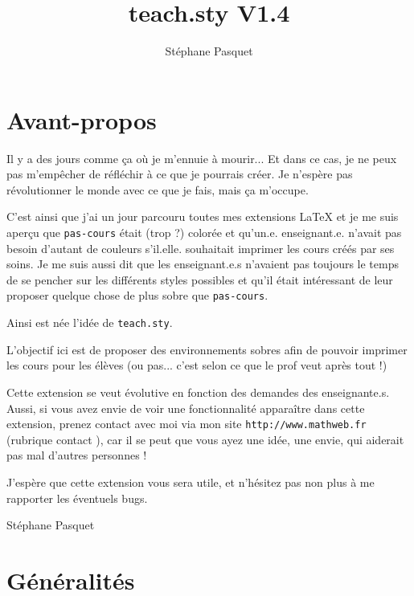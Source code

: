 \documentclass[12pt,a4paper,openany]{book}
\author{Stéphane Pasquet}
\title{teach.sty V1.4}
\begin{document}
\frontmatter
\dominitoc

\maketitle



\chapter*{Avant-propos}

Il y a des jours comme ça où je m'ennuie à mourir... Et dans ce cas, je ne peux pas m'empêcher de réfléchir à ce que je pourrais créer. Je n'espère pas révolutionner le monde avec ce que je fais, mais ça m'occupe.

\medskip

C'est ainsi que j'ai un jour parcouru toutes mes extensions \LaTeX{} et je me suis aperçu que \texttt{pas-cours} était (trop ?) colorée et qu'un.e. enseignant.e. n'avait pas besoin d'autant de couleurs s'il.elle. souhaitait imprimer les cours créés par ses soins. Je me suis aussi dit que les enseignant.e.s n'avaient pas toujours le temps de se pencher sur les différents styles possibles et qu'il était intéressant de leur proposer quelque chose de plus sobre que \texttt{pas-cours}.

Ainsi est née l'idée de \texttt{teach.sty}.

\medskip

L'objectif ici est de proposer des environnements sobres afin de pouvoir imprimer les cours pour les élèves (ou pas... c'est selon ce que le prof veut après tout !)

\medskip

Cette extension se veut évolutive en fonction des demandes des enseignante.s. Aussi, si vous avez envie de voir une fonctionnalité apparaître dans cette extension, prenez contact avec moi via mon site \texttt{http://www.mathweb.fr} (rubrique \og contact \fg), car il se peut que vous ayez une idée, une envie, qui aiderait pas mal d'autres personnes !

\bigskip

J'espère que cette extension vous sera utile, et n'hésitez pas non plus à me rapporter les éventuels bugs.

\vspace*{1cm}

Stéphane Pasquet

\tableofcontents

\mainmatter
\chapter{Généralités}
\end{document}
